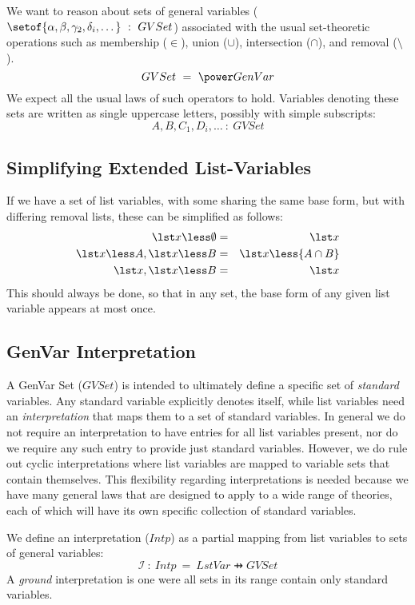 We want to reason about sets of general variables 
($\setof{\alpha,\beta,\gamma_2,\delta_i,\dots} ~:~ GVSet$)
associated with the usual set-theoretic operations such as
membership ($\in$),
union ($\cup$),
intersection ($\cap$),
and removal ($\setminus$).
%
$$GVSet ~=~ \power GenVar$$
%
We expect all the usual laws of such operators to hold.
Variables denoting these sets are written as single uppercase letters, 
possibly with simple subscripts:
%
$$A,B,C_1,D_i,\dots ~:~ GVSet$$

\subsection{Simplifying Extended List-Variables}

If we have a set of list variables, with some sharing the same base form,
but with differing removal lists, these can be simplified as follows:
\begin{eqnarray*}
   \lst x \less\emptyset &=& \lst x
\\ \lst x \less A, \lst x \less B &=& \lst x \less{A\cap B}
\\ \lst x,\lst x \less B &=& \lst x
\end{eqnarray*}
This should always be done, 
so that in any set, 
the base form of any given list variable appears at most once.

\subsection{GenVar Interpretation}

A GenVar Set ($GVSet$) is intended to ultimately define
a specific set of \emph{standard} variables.
Any standard variable explicitly denotes itself,
while list variables need an \emph{interpretation} 
that maps them to a set of standard variables.
In general we do not require an interpretation to have entries
for all list variables present, 
nor do we require any such entry to provide just standard variables.
However, 
we do rule out cyclic interpretations where list variables are mapped
to variable sets that contain themselves.
This flexibility regarding interpretations is needed 
because we have many general laws 
that are designed to apply to a wide range of theories,
each of which will have its own specific collection of standard variables.

We define an interpretation ($Intp$) as a partial mapping from list variables
to sets of general variables:
%
\def\intp{\mathcal I}
$$\intp ~:~ Intp ~=~ LstVar \pfun GVSet$$
%
A \emph{ground} interpretation is one were all sets in its range
contain only standard variables.

